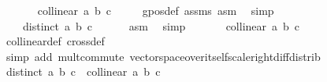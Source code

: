 \begin{isabellebody}
\ \ \ \ \isamarkupfalse%
\ {}{\isacharcolon}{\kern0pt}{\isachardoublequoteopen}{\isasymnot}\ collinear{}\ {\isacharparenleft}{\kern0pt}a{\isacharparenright}{\kern0pt}\ {\isacharparenleft}{\kern0pt}b{\isacharparenright}{\kern0pt}\ {\isacharparenleft}{\kern0pt}c{\isacharparenright}{\kern0pt}{\isachardoublequoteclose}\ \ \ \ \isamarkupfalse%
\ gpos{\isacharunderscore}{\kern0pt}def\ assms\ asm\ \isamarkupfalse%
\ simp\isanewline
\ \ \ \ \isamarkupfalse%
\ \ {}{\isacharcolon}{\kern0pt}\ \ {\isachardoublequoteopen}distinct\ {\isacharbrackleft}{\kern0pt}{\isacharminus}{\kern0pt}a{\isacharcomma}{\kern0pt}\ {\isacharminus}{\kern0pt}b{\isacharcomma}{\kern0pt}\ {\isacharminus}{\kern0pt}c{\isacharbrackright}{\kern0pt}{\isachardoublequoteclose}\ \ \ \ \ \isamarkupfalse%
\ asm\ \isamarkupfalse%
\ simp\isanewline
\ \ \ \ \isamarkupfalse%
\ \ {}{\isacharcolon}{\kern0pt}{\isachardoublequoteopen}{\isasymnot}collinear{}\ {\isacharparenleft}{\kern0pt}{\isacharminus}{\kern0pt}a{\isacharparenright}{\kern0pt}\ {\isacharparenleft}{\kern0pt}{\isacharminus}{\kern0pt}b{\isacharparenright}{\kern0pt}\ {\isacharparenleft}{\kern0pt}{\isacharminus}{\kern0pt}c{\isacharparenright}{\kern0pt}{\isachardoublequoteclose}\ \ \isamarkupfalse%
\ {}\ \isamarkupfalse%
\ collinear{}{\isacharunderscore}{\kern0pt}def\ cross{}{\isacharunderscore}{\kern0pt}def\isanewline
\ \ \ \ \ \ \isamarkupfalse%
\ {\isacharparenleft}{\kern0pt}simp\ add{\isacharcolon}{\kern0pt}\ mult{\isachardot}{\kern0pt}commute\ vector{\isacharunderscore}{\kern0pt}space{\isacharunderscore}{\kern0pt}over{\isacharunderscore}{\kern0pt}itself{\isachardot}{\kern0pt}scale{\isacharunderscore}{\kern0pt}right{\isacharunderscore}{\kern0pt}diff{\isacharunderscore}{\kern0pt}distrib{\isacharparenright}{\kern0pt}\isanewline
\ \ \ \ \isamarkupfalse%
\ {\isachardoublequoteopen}distinct\ {\isacharbrackleft}{\kern0pt}{\isacharminus}{\kern0pt}a{\isacharcomma}{\kern0pt}\ {\isacharminus}{\kern0pt}b{\isacharcomma}{\kern0pt}\ {\isacharminus}{\kern0pt}c{\isacharbrackright}{\kern0pt}\ {\isasymlongrightarrow}\ {\isasymnot}collinear{}\ {\isacharparenleft}{\kern0pt}{\isacharminus}{\kern0pt}a{\isacharparenright}{\kern0pt}\ {\isacharparenleft}{\kern0pt}{\isacharminus}{\kern0pt}b{\isacharparenright}{\kern0pt}\ {\isacharparenleft}{\kern0pt}{\isacharminus}{\kern0pt}c{\isacharparenright}{\kern0pt}{\isachardoublequoteclose}\ \isamarkupfalse%

\end{isabellebody}

